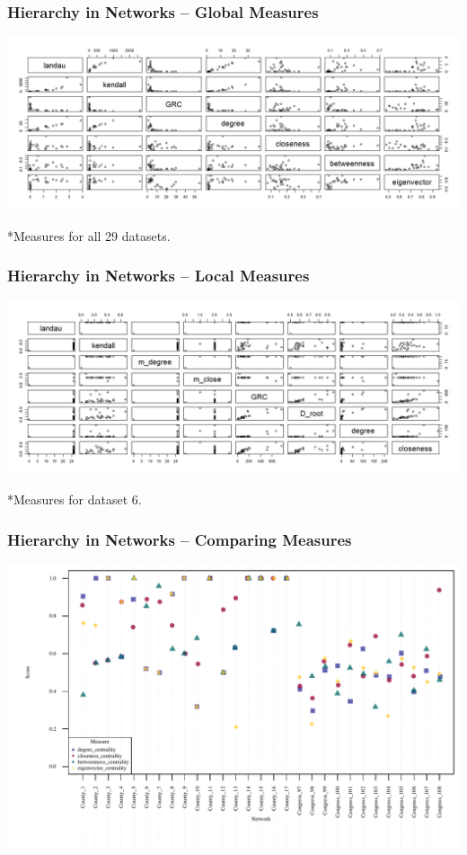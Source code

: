 \documentclass[xcolor={table}]{beamer}
\newenvironment{changemargin}[2]{%
  \begin{list}{}{%
    \setlength{\topsep}{0pt}%
    \setlength{\leftmargin}{#1}%
    \setlength{\rightmargin}{#2}%
    \setlength{\listparindent}{\parindent}%
    \setlength{\itemindent}{\parindent}%
    \setlength{\parsep}{\parskip}%
  }%
  \item[]}{\end{list}}
\begin{document}
\begin{frame}\frametitle{Hierarchy in Networks -- Global Measures}
\begin{changemargin}{-2cm}{ -2cm}
	\centering
\includegraphics[scale = 0.3]{images/pairs_global.jpeg}
\end{changemargin}
\tiny
*Measures for all 29 datasets.
\end{frame}

\begin{frame}\frametitle{Hierarchy in Networks -- Local Measures}
	\begin{changemargin}{-2cm}{ -2cm}
		\centering
		\includegraphics[scale = 0.3]{images/pairs_local.jpeg}
	\end{changemargin}
	\tiny
	*Measures for dataset 6.
\end{frame}

\begin{frame}\frametitle{Hierarchy in Networks -- Comparing Measures}
\begin{changemargin}{-2cm}{ -2cm}
	\centering
\includegraphics[scale = 0.65]{images/Measure_Scores.pdf}
\end{changemargin}
\end{frame}
\end{document}
